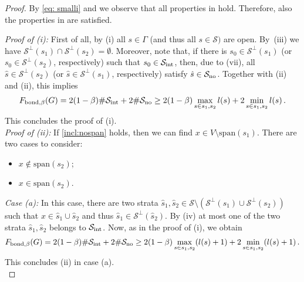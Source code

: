 \documentclass[reqno]{amsart}
\theoremstyle{plain}
\theoremstyle{definition}
\numberwithin{equation}{section}
\begin{document}
\begin{proof} 
By  \eqref{eq: smalli} and  we observe that all properties in  hold. Therefore, also the properties in  are satisfied.  



\noindent\emph{Proof of {\rm (i)}:} First of all, by (i) all $s\in \Gamma$ (and thus all $s \in \mathcal{S})$ are open.  By~(iii) we have $\mathcal{S}^\perp(s_1) \cap \mathcal{S}^\perp(s_2)=\emptyset$.  Moreover, note that, if there is $s_0 \in  \mathcal{S}^\perp(s_1) $ (or $s_0 \in  \mathcal{S}^\perp(s_2) $, respectively)  such that $s_0 \in \mathcal{S}_{\rm int}$, then,  due to (vii), all $\hat{s} \in \mathcal{S}^\perp(s_2)$ (or $\hat{s} \in \mathcal{S}^\perp(s_1)$, respectively)   satisfy $\hat{s} \in \mathcal{S}_{\rm no}$.   Together with  (ii) and   (ii), this implies
\begin{align*}
 F_{\mathrm{bond},\beta} (G)  =  2(1-\beta) \#\mathcal{S}_{\rm int} + 2\#\mathcal{S}_{\rm no} \geq 2(1-\beta)\max_{s \in s_1,s_2} l(s) + 2\min_{s \in s_1,s_2} l(s) \,.
\end{align*}
This concludes the proof of (i). \\ 
\noindent\emph{Proof of {\rm (ii)}:} If \eqref{incl:nospan} holds, then we can find $x \in V \setminus \mathrm{span}(s_1)$. There are two cases to consider:
\begin{itemize}
\item[(a)] $x \notin \mathrm{span}(s_2)$;
\item[(b)] $x \in \mathrm{span}(s_2)$.
\end{itemize}
\noindent \emph{Case {\rm (a)}:} In this case, there are two strata $\hat{s}_1,\hat{s}_2 \in \mathcal{S} \setminus\left( \mathcal{S}^\perp(s_1) \cup \mathcal{S}^\perp(s_2)\right)$ such that $x \in  \hat{s}_1\cup\hat{s}_2$ and thus $\hat{s}_1 \in \mathcal{S}^\perp(\hat{s}_2)$. By (iv) at most one of the two strata $\hat{s}_1, \hat{s}_2$ belongs to $\mathcal{S}_{\rm int}$. Now, as in the proof of (i), we obtain 
\begin{align*}
 F_{\mathrm{bond},\beta}  (G)  =  2(1-\beta) \#\mathcal{S}_{\rm int} + 2\#\mathcal{S}_{\rm no} \geq  2(1-\beta) \max_{s \in s_1,s_2} (l(s)+1) + 2\min_{s \in s_1,s_2} (l(s)+1) \,.
\end{align*}
This concludes (ii) in case (a). \\ 

\end{proof}
\end{document}
